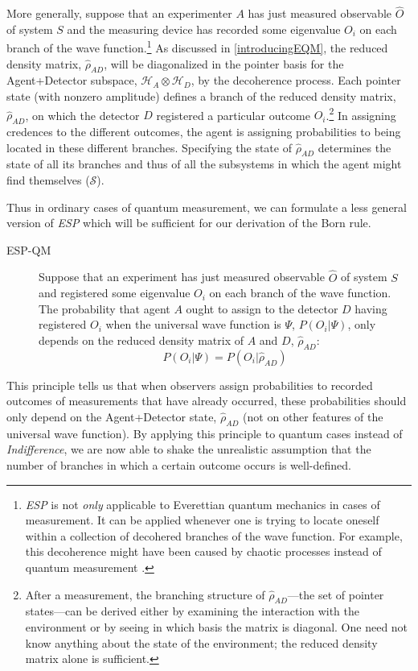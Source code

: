 \documentclass[12pt,onecolumn,secnumarabic,amsmath,amssymb,balancelastpage,nofootinbib]{article}
\begin{document}
More generally, suppose that an experimenter $A$ has just measured observable $\widehat{O}$ of system $S$ and the measuring device has recorded some eigenvalue $O_i$ on each branch of the wave function.\footnote{\emph{ESP} is not \emph{only} applicable to Everettian quantum mechanics in cases of measurement.  It can be applied whenever one is trying to locate oneself within a collection of decohered branches of the wave function.  For example, this decoherence might have been caused by chaotic processes instead of quantum measurement \citep[ch. 3]{wallace2012}.}  As discussed in \textsection \ref{introducingEQM}, the reduced density matrix, $\widehat{\rho}_{AD}$, will be diagonalized in the pointer basis for the Agent+Detector subspace, $\mathscr{H}_A\otimes \mathscr{H}_D$, by the decoherence process.  Each pointer state (with nonzero amplitude) defines a branch of the reduced density matrix, $\widehat{\rho}_{AD}$, on which the detector $D$ registered a particular outcome $O_i$.\footnote{After a measurement, the branching structure of $\widehat{\rho}_{AD}$---the set of pointer states---can be derived either by examining the interaction with the environment or by seeing in which basis the matrix is diagonal.  One need not know anything about the state of the environment; the reduced density matrix alone is sufficient.}  In assigning credences to the different outcomes, the agent is assigning probabilities to being located in these different branches.  Specifying the state of $\widehat{\rho}_{AD}$ determines the state of all its branches and thus of all the subsystems in which the agent might find themselves ($\mathcal{S}$).

Thus in ordinary cases of quantum measurement, we can formulate a less general version of \emph{ESP} which will be sufficient for our derivation of the Born rule.
\begin{description}
\item[ESP-QM]  Suppose that an experiment has just measured observable $\widehat{O}$ of system $S$ and registered some eigenvalue $O_i$ on each branch of the wave function.  The probability that agent $A$ ought to assign to the detector $D$ having registered $O_i$ when the universal wave function is $\Psi$, $P(O_i|\Psi)$, only depends on the reduced density matrix of $A$ and $D$, $\widehat{\rho}_{AD}$:
\begin{equation}
P(O_i|\Psi)=P(O_i|\widehat{\rho}_{AD})
\end{equation}
\end{description}
This principle tells us that when observers assign probabilities to recorded outcomes of measurements that have already occurred, these probabilities should only depend on the Agent+Detector state, $\widehat{\rho}_{AD}$ (not on other features of the universal wave function).  By applying this principle to quantum cases instead of \emph{Indifference}, we are now able to shake the unrealistic assumption that the number of branches in which a certain outcome occurs is well-defined.
\end{document}
